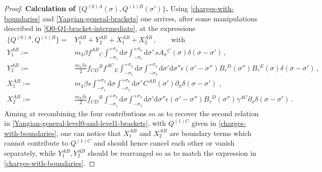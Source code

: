 \documentclass[12pt]{article}
\numberwithin{equation}{section}
\begin{document}
\begin{proof}
\textbf{Calculation of $\{Q^{(0)A}(\sigma),Q^{(1)B}(\sigma')\}$.} \quad
Using \eqref{charges-with-boundaries} and \eqref{Yangian-general-brackets} one arrives, after some manipulations described in \eqref{Q0-Q1-bracket-intermediate}, at the expressions
\begin{equation}\label{Q0Q1-first-step}
\begin{aligned}
\{Q^{(0)A},Q^{(1)B}\}=&Y_{1}^{AB}+Y_{2}^{AB}+X_{1}^{AB}+X_{2}^{AB} \, , \qquad \text{with}
\\
Y_{1}^{AB}:=& m_{3}\beta f^{AB}{}_{C}  \!\! \int_{-\sigma_{1}}^{+\sigma_{2}}\!\!\!\!\!\!\!\!\!\!\mathrm{d}\sigma
\!\! \int_{-\sigma_{5}}^{+\sigma_{6}}\!\!\!\!\!\!\!\!\!\!\mathrm{d}\sigma' \,sA_{\sigma}{}^{C}(\sigma)\delta(\sigma \!-\! \sigma') \, ,
\\
Y_{2}^{AB}:=&\tfrac{m_{1}\beta s}{2}f_{CD}{}^{B}f^{AC}{}_{E}\!\!\!\int_{-\sigma_{1}}^{+\sigma_{2}}\!\!\!\!\!\!\!\!\!\!\mathrm{d}\sigma \!\! \int_{-\sigma_{3}}^{+\sigma_{4}}\!\!\!\!\!\!\!\!\!\!\mathrm{d}\sigma'\mathrm{d}\sigma''  \epsilon(\sigma'\!-\!\sigma'') B_{\tau}{}^{D}(\sigma'')B_{\tau}{}^{E}(\sigma)\delta(\sigma-\sigma') \, ,
\\
X_{1}^{AB}:=&m_{4}\beta s \int_{-\sigma_{1}}^{+\sigma_{2}}\!\!\!\!\!\!\!\!\!\!\mathrm{d}\sigma
\int_{-\sigma_{5}}^{+\sigma_{6}}\!\!\!\!\!\!\!\!\!\!\mathrm{d}\sigma' \,C^{AB}(\sigma')\partial_{\sigma}\delta(\sigma-\sigma') \,\, ,
\\
X_{2}^{AB}:=&\tfrac{m_{2}\beta s}{2}f_{CD}{}^{B}\!\!\!\int_{-\sigma_{1}}^{+\sigma_{2}}\!\!\!\!\!\!\!\!\!\!\mathrm{d}\sigma \!\! \int_{-\sigma_{3}}^{+\sigma_{4}}\!\!\!\!\!\!\!\!\!\!\mathrm{d}\sigma'\mathrm{d}\sigma''  \epsilon(\sigma'\!-\!\sigma'') B_{\tau}{}^{D}(\sigma'')\gamma^{AC}\partial_{\sigma}\delta(\sigma-\sigma') \, .
\end{aligned}
\end{equation}
Aiming at recombining the four contributions so as to recover the second relation in \eqref{Yangian-general-level0-and-level1-brackets}, with $Q^{(1)C}$ given in \eqref{charges-with-boundaries}, one can notice that $X_{1}^{AB}$ and $X_{2}^{AB}$ are boundary terms which cannot contribute to $Q^{(1)C}$ and should hence cancel each other or vanish separately, while $Y_{1}^{AB},Y_{2}^{AB}$ should be rearranged so as to match the expression in \eqref{charges-with-boundaries}.


\end{proof}
\end{document}
